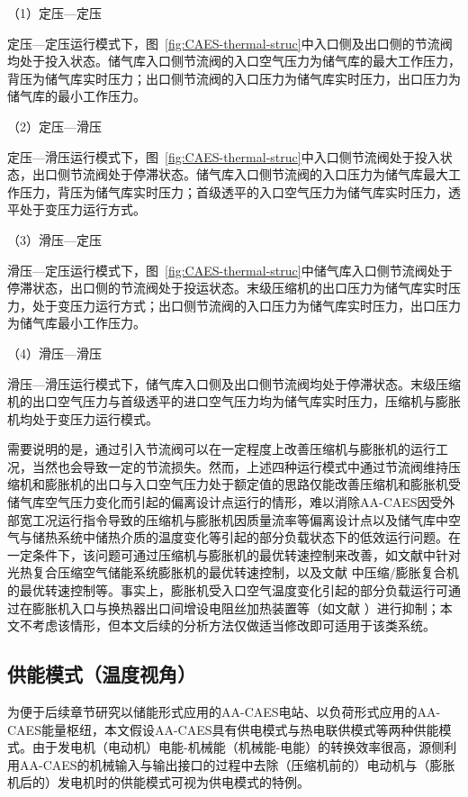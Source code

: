 （1）定压—定压

 定压—定压运行模式下，图~\ref{fig:CAES-thermal-struc}中入口侧及出口侧的节流阀均处于投入状态。储气库入口侧节流阀的入口空气压力为储气库的最大工作压力，背压为储气库实时压力；出口侧节流阀的入口压力为储气库实时压力，出口压力为储气库的最小工作压力。

（2）定压—滑压

 定压—滑压运行模式下，图~\ref{fig:CAES-thermal-struc}中入口侧节流阀处于投入状态，出口侧节流阀处于停滞状态。储气库入口侧节流阀的入口压力为储气库最大工作压力，背压为储气库实时压力；首级透平的入口空气压力为储气库实时压力，透平处于变压力运行方式。

（3）滑压—定压

滑压—定压运行模式下，图~\ref{fig:CAES-thermal-struc}中储气库入口侧节流阀处于停滞状态，出口侧的节流阀处于投运状态。末级压缩机的出口压力为储气库实时压力，处于变压力运行方式；出口侧节流阀的入口压力为储气库实时压力，出口压力为储气库最小工作压力。

（4）滑压—滑压

滑压—滑压运行模式下，储气库入口侧及出口侧节流阀均处于停滞状态。末级压缩机的出口空气压力与首级透平的进口空气压力均为储气库实时压力，压缩机与膨胀机均处于变压力运行模式。

需要说明的是，通过引入节流阀可以在一定程度上改善压缩机与膨胀机的运行工况，当然也会导致一定的节流损失。然而，上述四种运行模式中通过节流阀维持压缩机和膨胀机的出口与入口空气压力处于额定值的思路仅能改善压缩机和膨胀机受储气库空气压力变化而引起的偏离设计点运行的情形，难以消除AA-CAES因受外部宽工况运行指令导致的压缩机与膨胀机因质量流率等偏离设计点以及储气库中空气与储热系统中储热介质的温度变化等引起的部分负载状态下的低效运行问题。在一定条件下，该问题可通过压缩机与膨胀机的最优转速控制来改善，如文献中针对光热复合压缩空气储能系统膨胀机的最优转速控制，以及文献 中压缩/膨胀复合机的最优转速控制等。事实上，膨胀机受入口空气温度变化引起的部分负载运行可通过在膨胀机入口与换热器出口间增设电阻丝加热装置等（如文献
）进行抑制；本文不考虑该情形，但本文后续的分析方法仅做适当修改即可适用于该类系统。

\subsection{供能模式（温度视角）}
为便于后续章节研究以储能形式应用的AA-CAES电站、以负荷形式应用的AA-CAES能量枢纽，本文假设AA-CAES具有供电模式与热电联供模式等两种供能模式。由于发电机（电动机）电能-机械能（机械能-电能）的转换效率很高，源侧利用AA-CAES的机械输入与输出接口的过程中去除（压缩机前的）电动机与（膨胀机后的）发电机时的供能模式可视为供电模式的特例。

